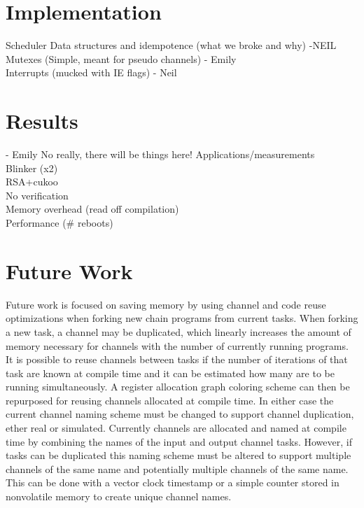 \documentclass[11pt]{sensys-proc}
\begin{document}
\section{Implementation}
Scheduler Data structures and idempotence (what we broke and why) -NEIL\\
Mutexes (Simple, meant for pseudo channels) - Emily\\
Interrupts (mucked with IE flags) - Neil\\


\section{Results} - Emily
No really, there will be things here!
Applications/measurements\\
Blinker (x2)\\
RSA+cukoo\\
No verification\\
Memory overhead (read off compilation)\\
Performance (\# reboots)\\


\section{Future Work}
Future work is focused on saving memory by using channel and code reuse optimizations when forking new chain programs from current tasks.
When forking a new task, a channel may be duplicated, which linearly increases the amount of memory necessary for channels with the number of currently running programs.
It is possible to reuse channels between tasks if the number of iterations of that task are known at compile time and it can be estimated how
many are to be running simultaneously. A register allocation graph coloring scheme can then be repurposed for reusing channels allocated at compile time.
In either case the current channel naming scheme must be changed to support channel duplication, ether real or simulated.
Currently channels are allocated and named at compile time by combining the names of the input and output channel tasks.
However, if tasks can be duplicated this naming scheme must be altered to support multiple channels of the same name and potentially multiple channels of the same name.
This can be done with a vector clock timestamp or a simple counter stored in nonvolatile memory to create unique channel names.
\end{document}

